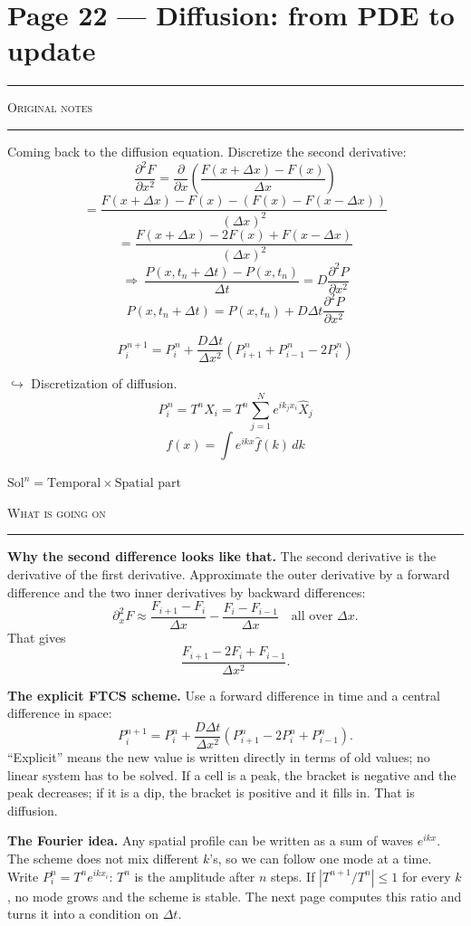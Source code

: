 \documentclass[10pt,a4paper]{article}
\newcommand{\fiteq}[1]{\par\noindent\adjustbox{max width=\linewidth}{$\displaystyle #1$}\par}
\newcommand{\pairpage}[3]{%
  \clearpage
  \section*{\normalsize Page #1}
  \vspace{-0.9em}
  {\color{black!35}\rule{\linewidth}{0.4pt}}\par\vspace{0.2em}
  \noindent
  \begin{minipage}[t]{0.473\textwidth}
    {\scriptsize\textsc{Original notes}}\par\vspace{0.15em}
    {\color{black!25}\rule{\linewidth}{0.3pt}}\par\vspace{0.2em}
    #2
  \end{minipage}%
  \hfill
  \begin{minipage}[t]{0.473\textwidth}
    {\scriptsize\textsc{What is going on}}\par\vspace{0.15em}
    {\color{black!25}\rule{\linewidth}{0.3pt}}\par\vspace{0.2em}
    #3
  \end{minipage}%
}
\begin{document}
\pairpage{22 --- Diffusion: from PDE to update}{%
Coming back to the diffusion equation. Discretize the second
derivative:
\[
\frac{\partial^2F}{\partial x^2}
=\frac{\partial}{\partial x}
\left(\frac{F(x+\Delta x)-F(x)}{\Delta x}\right)
\]
\[
=\frac{F(x+\Delta x)-F(x)-(F(x)-F(x-\Delta x))}{(\Delta x)^2}
\]
\[
=\frac{F(x+\Delta x)-2F(x)+F(x-\Delta x)}{(\Delta x)^2}
\]
\[
\Rightarrow\ 
\frac{P(x,t_n+\Delta t)-P(x,t_n)}{\Delta t}
=D\frac{\partial^2P}{\partial x^2}
\]
\[
P(x,t_n+\Delta t)=P(x,t_n)+D\Delta t\frac{\partial^2P}{\partial x^2}
\]
\fiteq{
=P(x_i,t_n)+\frac{D\Delta t}{\Delta x^2}
\left[P(x_{i+1},t_n)+P(x_{i-1},t_n)-2P(x_i,t_n)\right]
}
\begin{handbox}
\[
P_i^{\,n+1}=P_i^{\,n}
+\frac{D\Delta t}{\Delta x^2}
\left(P_{i+1}^{\,n}+P_{i-1}^{\,n}-2P_i^{\,n}\right)
\]
\end{handbox}
$\hookrightarrow$ Discretization of diffusion.
\[
P_i^{\,n}=T^nX_i
=T^n\sum_{j=1}^{N}e^{ik_jx_i}\hat X_j
\]
\[
f(x)=\int e^{ikx}\hat f(k)\,dk
\]
\begin{handbox}
\centering
$\text{Sol}^n=\text{Temporal}\times\text{Spatial part}$
\end{handbox}
}{%
\textbf{Why the second difference looks like that.} The second
derivative is the derivative of the first derivative. Approximate the
outer derivative by a forward difference and the two inner derivatives
by backward differences:
\[
\partial_x^2F\approx
\frac{F_{i+1}-F_i}{\Delta x}
-\frac{F_i-F_{i-1}}{\Delta x}
\quad\text{all over }\Delta x.
\]
That gives
\[
\frac{F_{i+1}-2F_i+F_{i-1}}{\Delta x^2}.
\]

\textbf{The explicit FTCS scheme.} Use a forward difference in time and
a central difference in space:
\[
P_i^{n+1}=P_i^n+\frac{D\Delta t}{\Delta x^2}
(P_{i+1}^n-2P_i^n+P_{i-1}^n).
\]
``Explicit'' means the new value is written directly in terms of old
values; no linear system has to be solved. If a cell is a peak, the
bracket is negative and the peak decreases; if it is a dip, the bracket
is positive and it fills in. That is diffusion.

\textbf{The Fourier idea.} Any spatial profile can be written as a sum
of waves $e^{ikx}$. The scheme does not mix different $k$'s, so we can
follow one mode at a time. Write
$P_i^n=T^n e^{ikx_i}$: $T^n$ is the amplitude after $n$ steps. If
$|T^{n+1}/T^n|\le1$ for every $k$, no mode grows and the scheme is
stable. The next page computes this ratio and turns it into a condition
on $\Delta t$.
}
\end{document}
